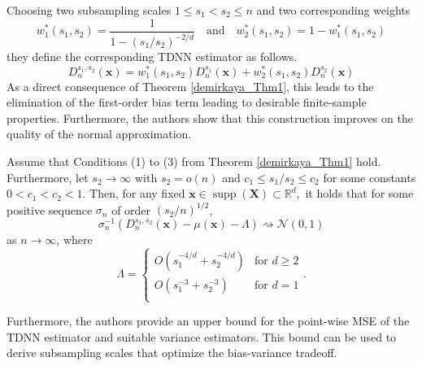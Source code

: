 \documentclass[letterpaper,10pt]{article}
\numberwithin{equation}{section}
\numberwithin{theorem}{section}
\theoremstyle{definition}
\newcommand{\1}{\mathbb{1}}
\begin{document}
Choosing two subsampling scales $1 \leq s_1 < s_2 \leq n$ and two corresponding weights
\begin{equation}
	w_1^{*}(s_1, s_2) = \frac{1}{1-(s_1/s_2)^{-2/d}}
	\quad\text{and}\quad
	w_2^{*}(s_1, s_2) = 1 - w_1^{*}(s_1, s_2)
\end{equation}
they define the corresponding TDNN estimator as follows.
\begin{equation}
	D_n^{s_1, s_2}\left(\mathbf{x}\right)
	= w_1^{*}(s_1, s_2)D_{n}^{s_1}\left(\mathbf{x}\right) + w_2^{*}(s_1, s_2)D_{n}^{s_2}\left(\mathbf{x}\right)
\end{equation}
As a direct consequence of Theorem \ref{demirkaya_Thm1}, this leads to the elimination of the first-order bias term leading to desirable finite-sample properties.
Furthermore, the authors show that this construction improves on the quality of the normal approximation.

\vspace{0.5cm}
\begin{theorem}\label{demirkaya_Thm3}
	Assume that Conditions (1) to (3) from Theorem \ref{demirkaya_Thm1} hold.
	Furthermore, let $s_2 \rightarrow \infty$ with $s_2 = o(n)$ and $c_1 \leq s_1/s_2 \leq c_2$ for some constants $0 < c_1 < c_2 < 1$.
	Then, for any fixed $\mathbf{x} \in \operatorname{supp}(\mathbf{X}) \subset \mathbb{R}^d,$ it holds that for some positive sequence $\sigma_n$ of order $(s_2/n)^{1/2}$,
	\begin{equation}
		\sigma_n^{-1} \left(D_{n}^{s_1, s_2}\left(\mathbf{x}\right) - \mu(\mathbf{x}) - \Lambda\right) \rightsquigarrow \mathcal{N}(0,1)
	\end{equation}
	as $n \rightarrow \infty$, where
	\begin{equation*}
		\Lambda = \begin{cases}
			O\left(s_1^{-4/d} + s_2^{-4/d}\right) & \text{for } d \geq 2 \\
			O\left(s_1^{-3} + s_2^{-3}\right)     & \text{for } d = 1    \\
		\end{cases}.
	\end{equation*}
\end{theorem}
Furthermore, the authors provide an upper bound for the point-wise MSE of the TDNN estimator and suitable variance estimators.
This bound can be used to derive subsampling scales that optimize the bias-variance tradeoff.
\end{document}
